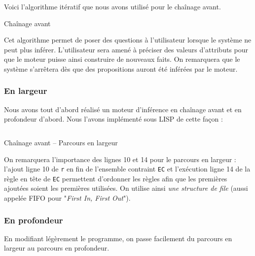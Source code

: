 \documentclass[a4paper,12pt]{article}
\begin{document}
Voici l'algorithme itératif que nous avons utilisé pour le chaînage avant.
\begin{algorithm}

\caption{Chaînage avant \label{algoChainageAvant}}
\end{algorithm}

Cet algorithme permet de poser des questions à l'utilisateur lorsque le système ne peut plus inférer. L'utilisateur sera amené à préciser des valeurs d'attributs pour que le moteur puisse ainsi construire de nouveaux faits. On remarquera que le système s'arrêtera dès que des propositions auront été inférées par le moteur.

\newpage
\subsubsection{En largeur}

	Nous avons tout d'abord réalisé un moteur d'inférence en chaînage avant et en profondeur d'abord. Nous l'avons implémenté sous LISP de cette façon :

\begin{listing}[H]
	\centering
	\inputminted[breaklines=true,linenos]{lisp}{../chainageAvantLarg.lisp}
	\caption{Chaînage avant -- Parcours en largeur}
\end{listing}

On remarquera l'importance des lignes 10 et 14 pour le parcours en largeur : l'ajout ligne 10 de \texttt{r} en fin de l'ensemble contraint \texttt{EC} et l'exécution ligne 14 de la règle en tête de \texttt{EC} permettent d'ordonner les règles afin que les premières ajoutées soient les premières utilisées. On utilise ainsi \textit{une structure de file} (aussi appelée FIFO pour "\textit{First In, First Out}").

\newpage
\subsubsection{En profondeur}

En modifiant légèrement le programme, on passe facilement du parcours en largeur au parcours en profondeur.
\end{document}
